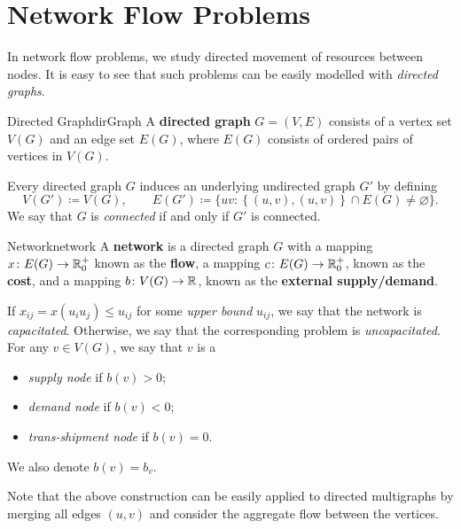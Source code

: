 \documentclass[math, code]{amznotes}
\theoremstyle{remark}
\begin{document}
\section{Network Flow Problems}
In network flow problems, we study directed movement of resources between nodes. It is easy to see that such problems can be easily modelled with \textit{directed graphs}.
\begin{dfnbox}{Directed Graph}{dirGraph}
    A {\color{red} \textbf{directed graph}} $G = (V, E)$ consists of a vertex set $V(G)$ and an edge set $E(G)$, where $E(G)$ consists of ordered pairs of vertices in $V(G)$.
\end{dfnbox}
Every directed graph $G$ induces an underlying undirected graph $G'$ by defining 
\begin{equation*}
    V(G') \coloneqq V(G), \qquad E(G') \coloneqq \bigl\{uv \colon \left\{(u, v), (u, v)\right\} \cap E(G) \neq \varnothing\bigr\}.
\end{equation*}
We say that $G$ is \textit{connected} if and only if $G'$ is connected.
\begin{dfnbox}{Network}{network}
    A {\color{red} \textbf{network}} is a directed graph $G$ with a mapping $x \colon E(G) \to \mathbb{R}^+_0$ known as the {\color{red} \textbf{flow}}, a mapping $c \colon E(G) \to \mathbb{R}^+_0$, known as the {\color{red} \textbf{cost}}, and a mapping $b \colon V(G) \to \mathbb{R}$, known as the {\color{red} \textbf{external supply/demand}}.
\end{dfnbox}
If $x_{ij} = x(u_iu_j) \leq u_{ij}$ for some \textit{upper bound} $u_{ij}$, we say that the network is \textit{capacitated}. Otherwise, we say that the corresponding problem is \textit{uncapacitated}. For any $v \in V(G)$, we say that $v$ is a
\begin{itemize}
    \item \textit{supply node} if $b(v) > 0$;
    \item \textit{demand node} if $b(v) < 0$;
    \item \textit{trans-shipment node} if $b(v) = 0$.
\end{itemize}
We also denote $b(v) = b_v$.

Note that the above construction can be easily applied to directed multigraphs by merging all edges $(u, v)$ and consider the aggregate flow between the vertices.
\end{document}

